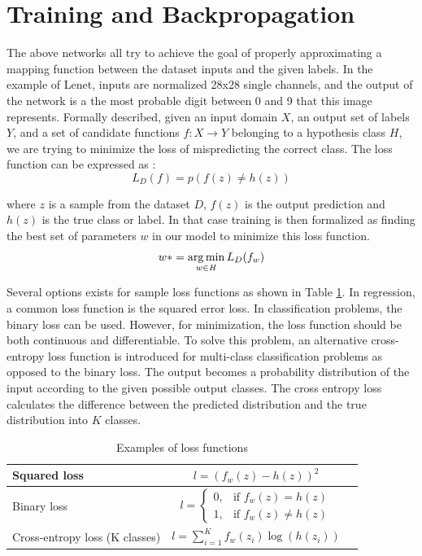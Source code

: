 \section{Training and Backpropagation}  \label{graddesc}

The above networks all try to achieve the goal of properly approximating a mapping function between the dataset inputs and the given labels. In the example of Lenet, inputs are normalized 28x28 single channels, and the output of the network is a the most probable digit between 0 and 9 that this image represents. Formally described, given an input domain $\mathit{X}$, an output set of labels $\mathit{Y}$, and a set of candidate functions $\mathit{f : X \rightarrow Y}$ belonging to a hypothesis class $\mathit{H}$, we are trying to minimize the loss of mispredicting the correct class. The loss function can be expressed as :
\begin{equation}
L_D(f) = p( f(z) \neq h(z)) 
\end{equation} 
 
 where $\mathit{z}$ is a sample from the dataset $\mathit{D}$,  $\mathit{f(z)}$ is the output prediction and $\mathit{h(z)}$ is the true class or label. In that case training is then formalized as finding the best set of parameters $\mathit{w}$ in our model to minimize this loss function. 
\begin{equation}
 w* = \operatorname*{arg\,min}\limits_{ w \in \mathit{H} } L_D(f_w)
 \end{equation}

Several options exists for sample loss functions as shown in Table \ref{tab:loss}. In regression, a common loss function is the squared error loss. In classification problems, the binary loss can be used. However, for minimization, the loss function should be both continuous and differentiable. To solve this problem, an alternative cross-entropy loss function is introduced for multi-class classification problems as opposed to the binary loss. The output becomes a probability distribution of the input according to the given possible output classes. The cross entropy loss calculates the difference between the predicted distribution and the true distribution into $\mathit{K}$ classes.

\begin{table}[h!]
	\centering
	\begin{tabular}{| l | c | r |}
		 \hline
	Squared loss 	& $l=(f_{w}(z)-h(z))^{2}$  \\ \hline
	Binary loss 	&  $l=\left\{\begin{array}{cl} 0, & \mbox{if }f_{w}(z)=h(z)\\ 1, & \mbox{if }f_{w}(z) \neq h(z) \end{array}\right.  $ \\ \hline
	Cross-entropy loss (K classes)	& $l=\sum_{i=1}^{K}f_{w}(z_{i})\log(h(z_{i}))$  \\
	 \hline
	\end{tabular}
\caption[Loss Functions]{Examples of loss functions}
\label{tab:loss}
\end{table}

